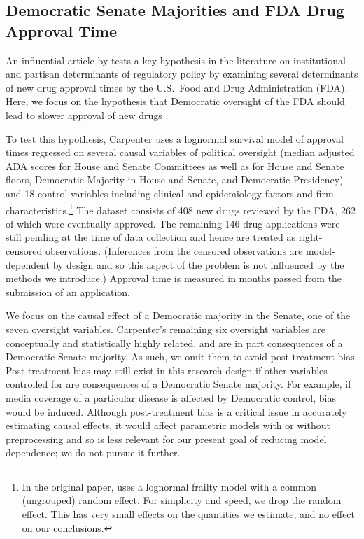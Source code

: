 \documentclass[11pt,titlepage]{article}
\begin{document}
\subsection{Democratic Senate Majorities and FDA Drug Approval Time}

An influential article by \citet{Carp02} tests a key hypothesis in the
literature on institutional and partisan determinants of regulatory
policy by examining several determinants of new drug approval times by
the U.S.\ Food and Drug Administration (FDA).  Here, we focus on the
hypothesis that Democratic oversight of the FDA should lead to slower
approval of new drugs \citep[p.495 and Model 1 of Table 2,
p.499]{Carp02}.

To test this hypothesis, Carpenter uses a lognormal survival model of
approval times regressed on several causal variables of political
oversight (median adjusted ADA scores for House and Senate Committees
as well as for House and Senate floors, Democratic Majority in House
and Senate, and Democratic Presidency) and 18 control variables
including clinical and epidemiology factors and firm
characteristics.\footnote{In the original paper, \citet{Carp02} uses a
  lognormal frailty model with a common (ungrouped) random effect.
  For simplicity and speed, we drop the random effect.  This has very
  small effects on the quantities we estimate, and no effect on our
  conclusions.}  The dataset consists of 408 new drugs reviewed by the
FDA, 262 of which were eventually approved.  The remaining 146 drug
applications were still pending at the time of data collection and
hence are treated as right-censored observations.  (Inferences from
the censored observations are model-dependent by design and so this
aspect of the problem is not influenced by the methods we introduce.)
Approval time is measured in months passed from the submission of an
application.

We focus on the causal effect of a Democratic majority in the Senate,
one of the seven oversight variables.  Carpenter's remaining six
oversight variables are conceptually and statistically highly related,
and are in part consequences of a Democratic Senate majority.  As
such, we omit them to avoid post-treatment bias.  Post-treatment bias
may still exist in this research design if other variables controlled
for are consequences of a Democratic Senate majority.  For example, if
media coverage of a particular disease is affected by Democratic
control, bias would be induced.  Although post-treatment bias is a
critical issue in accurately estimating causal effects, it would
affect parametric models with or without preprocessing and so is less
relevant for our present goal of reducing model dependence;
we do not pursue it further.
\end{document}
